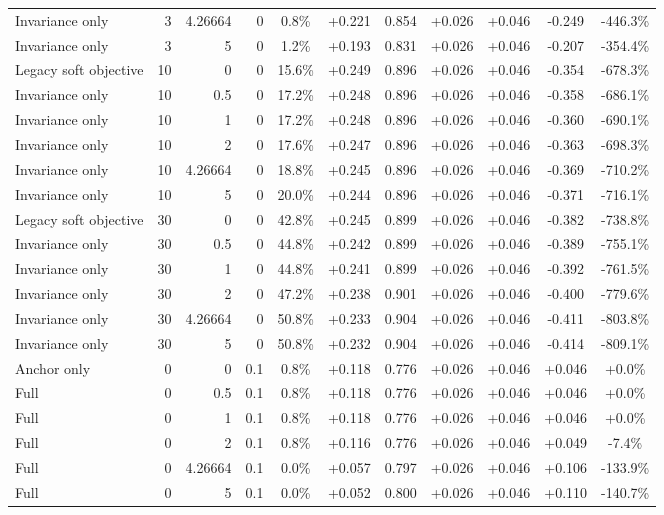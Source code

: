 \begin{table}[htbp]
\begin{tabular}{lrrrccccccc}
Invariance only & 3 & 4.26664 & 0 & 0.8\% & +0.221 & 0.854 & +0.026 & +0.046 & -0.249 & -446.3\% \\
Invariance only & 3 & 5 & 0 & 1.2\% & +0.193 & 0.831 & +0.026 & +0.046 & -0.207 & -354.4\% \\
Legacy soft objective & 10 & 0 & 0 & 15.6\% & +0.249 & 0.896 & +0.026 & +0.046 & -0.354 & -678.3\% \\
Invariance only & 10 & 0.5 & 0 & 17.2\% & +0.248 & 0.896 & +0.026 & +0.046 & -0.358 & -686.1\% \\
Invariance only & 10 & 1 & 0 & 17.2\% & +0.248 & 0.896 & +0.026 & +0.046 & -0.360 & -690.1\% \\
Invariance only & 10 & 2 & 0 & 17.6\% & +0.247 & 0.896 & +0.026 & +0.046 & -0.363 & -698.3\% \\
Invariance only & 10 & 4.26664 & 0 & 18.8\% & +0.245 & 0.896 & +0.026 & +0.046 & -0.369 & -710.2\% \\
Invariance only & 10 & 5 & 0 & 20.0\% & +0.244 & 0.896 & +0.026 & +0.046 & -0.371 & -716.1\% \\
Legacy soft objective & 30 & 0 & 0 & 42.8\% & +0.245 & 0.899 & +0.026 & +0.046 & -0.382 & -738.8\% \\
Invariance only & 30 & 0.5 & 0 & 44.8\% & +0.242 & 0.899 & +0.026 & +0.046 & -0.389 & -755.1\% \\
Invariance only & 30 & 1 & 0 & 44.8\% & +0.241 & 0.899 & +0.026 & +0.046 & -0.392 & -761.5\% \\
Invariance only & 30 & 2 & 0 & 47.2\% & +0.238 & 0.901 & +0.026 & +0.046 & -0.400 & -779.6\% \\
Invariance only & 30 & 4.26664 & 0 & 50.8\% & +0.233 & 0.904 & +0.026 & +0.046 & -0.411 & -803.8\% \\
Invariance only & 30 & 5 & 0 & 50.8\% & +0.232 & 0.904 & +0.026 & +0.046 & -0.414 & -809.1\% \\
Anchor only & 0 & 0 & 0.1 & 0.8\% & +0.118 & 0.776 & +0.026 & +0.046 & +0.046 & +0.0\% \\
Full & 0 & 0.5 & 0.1 & 0.8\% & +0.118 & 0.776 & +0.026 & +0.046 & +0.046 & +0.0\% \\
Full & 0 & 1 & 0.1 & 0.8\% & +0.118 & 0.776 & +0.026 & +0.046 & +0.046 & +0.0\% \\
Full & 0 & 2 & 0.1 & 0.8\% & +0.116 & 0.776 & +0.026 & +0.046 & +0.049 & -7.4\% \\
Full & 0 & 4.26664 & 0.1 & 0.0\% & +0.057 & 0.797 & +0.026 & +0.046 & +0.106 & -133.9\% \\
Full & 0 & 5 & 0.1 & 0.0\% & +0.052 & 0.800 & +0.026 & +0.046 & +0.110 & -140.7\% \\

\end{tabular}
\end{table}
